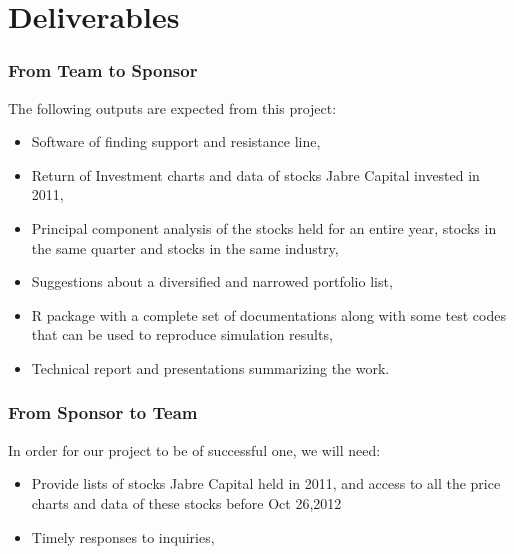 \documentclass[compress,handout,10pt]{beamer}
\let\olditem\item
\renewcommand{\item}{\setlength{\itemsep}{0.5\baselineskip}\olditem}
\begin{document}
\section{Deliverables}
\begin{frame}
    \frametitle{From Team to Sponsor}
The following outputs are expected from this project:
\begin{itemize}
    \item Software of finding support and resistance line,
    \item Return of Investment charts and data of stocks Jabre Capital invested in 2011,
    \item Principal component analysis of the stocks held for an entire year, stocks in the same quarter and stocks in the same industry,
    \item Suggestions about a diversified and narrowed portfolio list,
    \item R package with a complete set of documentations along with some test codes that can be used to reproduce simulation results,
    \item Technical report and presentations summarizing the work. 
\end{itemize}

\end{frame}

\begin{frame}
    \frametitle{From Sponsor to Team}
In order for our project to be of successful one, we will need:
\begin{itemize}
    \item Provide lists of stocks Jabre Capital held in 2011, and access to all the price charts and data of these stocks before Oct 26,2012
     \item Timely responses to inquiries, 
\end{itemize}

\end{frame}
\end{document}
